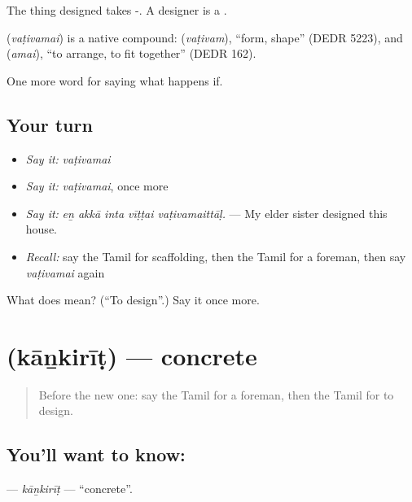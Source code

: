 The thing designed takes -. A designer is a .

\begin{cousinweb}
\textbf{} (\emph{vaṭivamai}) is a native compound:  (\emph{vaṭivam}), \textquotedblleft{}form, shape\textquotedblright{} (DEDR 5223), and  (\emph{amai}), \textquotedblleft{}to arrange, to fit together\textquotedblright{} (DEDR 162).
\end{cousinweb}

\begin{grammarlens}[title={What you've built}]
One more word for saying what happens if.
\end{grammarlens}

\subsection*{Your turn}
\begin{itemize}
\raggedright
  \item \emph{Say it:} \emph{vaṭivamai}
  \item \emph{Say it:} \emph{vaṭivamai}, once more
  \item \emph{Say it:} \emph{eṉ akkā inta vīṭṭai vaṭivamaittāḷ.} — My elder sister designed this house.
  \item \emph{Recall:} say the Tamil for scaffolding, then the Tamil for a foreman, then say \emph{vaṭivamai} again
\end{itemize}

\begin{tcolorbox}[breakable,colback=teal!4,colframe=teal!35!black,title={Before you move on}]
What does  mean? (\textquotedblleft{}To design\textquotedblright{}.) Say it once more.
\end{tcolorbox}
\section[\texorpdfstring{\ta{கான்கிரீட்} (kāṉkirīṭ)}{கான்கிரீட் (kāṉkirīṭ)}]{ (kāṉkirīṭ) — concrete}

\label{lesson:TA-C551-kankirit}



\begin{quote}
Before the new one: say the Tamil for a foreman, then the Tamil for to design.
\end{quote}

\subsection*{You'll want to know: }
\textbf{} — \emph{kāṉkirīṭ} — \textquotedblleft{}concrete\textquotedblright{}.

